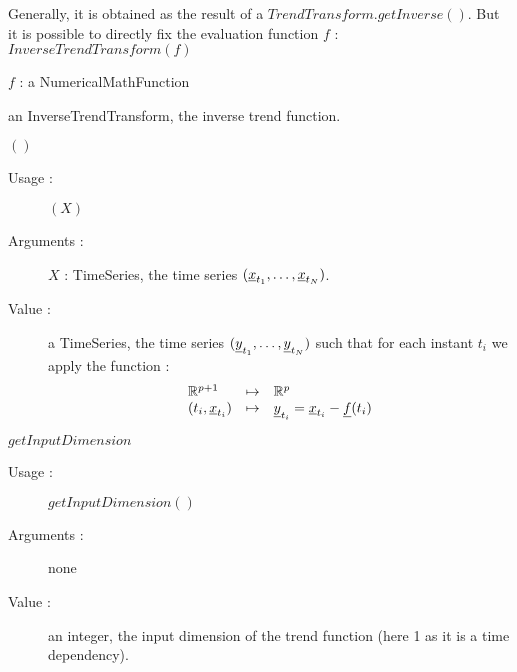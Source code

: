 \begin{description}

\item[Usage :] Generally, it is obtained as the result of a $TrendTransform.getInverse()$. But it is possible to directly fix the evaluation function $f$ :  $InverseTrendTransform(f)$
  \bigskip

\item[Arguments :]  \rule{0pt}{1em}
  \begin{description}
  \item $f$ : a NumericalMathFunction 
  \end{description}
  \bigskip

\item[Value :] an InverseTrendTransform, the inverse trend function.
  \bigskip

\item[Some methods :]  \rule{0pt}{1em}

  \begin{description}

   \item $()$
    \begin{description}
    \item[Usage :] $(X)$
    \item[Arguments :] $X$ : TimeSeries, the time series  $({\underline{x}}_{t_1}, \dots,{\underline{x}}_{t_N})$.
    \item[Value :]   a TimeSeries, the time series $({\underline{y}}_{t_1}, \dots,{\underline{y}}_{t_N})$ such that  for each instant $t_i$ we apply the function :
\begin{equation}
\begin{array}{lcl}\label{Eval}
  \mathbb{R}^{p+1} & \mapsto & \mathbb{R}^{p} \\
  (t_i,{\underline{x}}_{t_i}) & \mapsto & {\underline{y}}_{t_i} = {\underline{x}}_{t_i} - {\underline{f}}(t_i)
\end{array}
\end{equation}
    \end{description}
    \bigskip

   \item $getInputDimension$
    \begin{description}
    \item[Usage :] $getInputDimension()$
    \item[Arguments :] none
    \item[Value :]   an integer, the input dimension of the trend function (here 1 as it is a time dependency).
    \end{description}
    \bigskip


\end{description}
\end{description}
